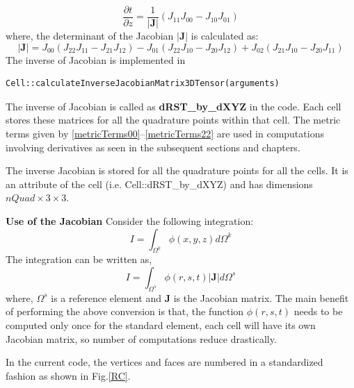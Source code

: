 \begin{equation}\label{metricTerms22}
	\frac{\partial t}{\partial z} = \frac{1}{|{\mathbf{J}}|} \left( J_{11}J_{00} - J_{10}J_{01}\right)
\end{equation}
where, the determinant of the Jacobian $|{\mathbf{J}}|$ is calculated as:
\begin{equation}\label{detJ}
	|{\mathbf{J}}| = J_{00} (J_{22}J_{11} - J_{21}J_{12}) - J_{01} (J_{22}J_{10} - J_{20}J_{12})  + J_{02} (J_{21}J_{10} - J_{20}J_{11}) 
\end{equation}
The inverse of Jacobian is implemented in 
\begin{verbatim} 
Cell::calculateInverseJacobianMatrix3DTensor(arguments) 
\end{verbatim}

\begin{note}
	The inverse of Jacobian is called as {\bf dRST\_by\_dXYZ} in the code. Each cell stores these matrices for all the quadrature
	points within that cell. The metric terms given by \ref{metricTerms00}--\ref{metricTerms22} 
	are used in computations involving derivatives as seen in the subsequent sections and chapters.
\end{note}
The inverse Jacobian is stored for all the quadrature points for all the cells. It is an attribute of the cell
(i.e. Cell::dRST\_by\_dXYZ) and has dimensions $nQuad \times 3 \times 3$.

{\bf Use of the Jacobian}
Consider the following integration:
\begin{equation}\label{J_example}
	I = \int_{\Omega^k} \phi(x,y,z) d\Omega^k
\end{equation}
The integration can be written as,
\begin{equation}
	I = \int_{\Omega^s} \phi(r,s,t) |\mathbf{J}| d\Omega^s
\end{equation}
where, $\Omega^s$ is a reference element and $\mathbf{J}$ is the Jacobian matrix.
The main benefit of performing the above conversion is that, the function $\phi(r,s,t)$ needs to be computed only once
for the standard element, each cell will have its own Jacobian matrix, so number of computations reduce drastically.

In the current code, the vertices and faces are numbered in a standardized fashion as shown in Fig.\ref{RC}.

